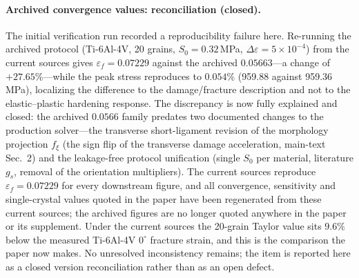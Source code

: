 \documentclass[11pt,a4paper,twocolumn]{article}
\providecommand{\ang}[1]{\ensuremath{#1^{\circ}}}
\begin{document}
\paragraph{Archived convergence values: reconciliation (closed).}
The initial verification run recorded a reproducibility failure here. Re-running the archived
protocol (Ti-6Al-4V, 20 grains, $S_0 = 0.32$\,MPa, $\Delta\varepsilon = 5\times10^{-4}$) from the current
sources gives $\varepsilon_f = 0.07229$ against the archived $0.05663$---a change of $+27.65\%$---while
the peak stress reproduces to $0.054\%$ (959.88 against 959.36\,MPa), localizing the difference to the
damage/fracture description and not to the elastic--plastic hardening response. The discrepancy is now fully
explained and closed: the archived $0.0566$ family predates two documented changes to the production
solver---the transverse short-ligament revision of the morphology projection $f_\xi$ (the sign flip of the
transverse damage acceleration, main-text Sec.~2) and the leakage-free protocol unification (single $S_0$
per material, literature $g_s$, removal of the orientation multipliers). The current sources reproduce
$\varepsilon_f = 0.07229$ for every downstream figure, and all convergence, sensitivity and single-crystal
values quoted in the paper have been regenerated from these current sources; the archived figures are no
longer quoted anywhere in the paper or its supplement. Under the current sources the 20-grain Taylor value
sits $9.6\%$ below the measured Ti-6Al-4V $\ang{0}$ fracture strain, and this is the comparison the paper
now makes. No unresolved inconsistency remains; the item is reported here as a closed version reconciliation
rather than as an open defect.
\end{document}
